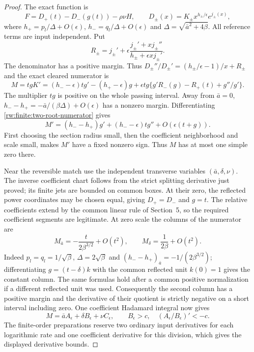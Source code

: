 \begin{proof}
The exact function is
\[
 F=D_+(t)-D_-(g(t))-\rho\nu H,\qquad
 D_\pm(x)=K_\pm x^{h_\pm/\epsilon}e^{j_\pm(x)},
\]
where $h_+=p_l/\Delta+O(\epsilon)$,
$h_-=q_l/\Delta+O(\epsilon)$ and $\Delta=\sqrt{\bar a^2+4\beta}$.
All reference terms are input independent. Put
\[
 R_\pm=j_\pm'+\epsilon
       \frac{j_\pm'+xj_\pm''}{h_\pm+\epsilon xj_\pm'}.
\]
The denominator has a positive margin. Thus
$D_\pm''/D_\pm'=(h_\pm/\epsilon-1)/x+R_\pm$
and the exact cleared numerator is
\begin{equation}\label{rw:finite:two-root-numerator}
 M=tgK'=(h_--\epsilon)tg'-(h_+-\epsilon)g
        +\epsilon tg\{g'R_-(g)-R_+(t)+g''/g'\}.
\end{equation}
The multiplier $tg$ is positive on the whole passing interval.
Away from $\bar a=0$,
$h_--h_+=-\bar a/(\beta\Delta)+O(\epsilon)$ has a nonzero
margin. Differentiating \eqref{rw:finite:two-root-numerator} gives
\[
 M'=(h_--h_+)g'+(h_--\epsilon)tg''+O(\epsilon(t+g)).
\]
First choosing the section radius small, then the coefficient
neighborhood and scale small, makes $M'$ have a fixed nonzero
sign. Thus $M$ has at most one simple zero there.

Near the reversible match use the independent transverse variables
$(\bar a,\delta,\nu)$. The inverse coefficient chart follows
from the strict splitting derivative just proved; its finite jets
are bounded on common boxes. At their zero, the reflected power
coordinates may be chosen equal, giving $D_+=D_-$ and $g=t$.
The relative coefficients extend by the common linear rule of
Section~5, so the required coefficient segments are legitimate.
At zero scale the columns of the numerator are
\[
 M_{\bar a}=-\frac{t}{2\beta^{3/2}}+O(t^2),\qquad
 M_\delta=\frac1{2\beta}+O(t^2).
\]
Indeed $p_l=q_l=1/\sqrt\beta$, $\Delta=2\sqrt\beta$ and
$(h_--h_+)_{\bar a}=-1/(2\beta^{3/2})$; differentiating
$g=(t-\delta)k$ with the common reflected unit $k(0)=1$
gives the constant column. The same formulas hold after a common
positive normalization if a different reflected unit was used.
Consequently the second column has a positive margin and the
derivative of their quotient is strictly negative on a short
interval including zero. One coefficient Hadamard integral now
gives
\[
 M=\bar a A_\epsilon+\delta B_\epsilon+\nu C_\epsilon,
 \qquad B_\epsilon>c,\quad (A_\epsilon/B_\epsilon)'<-c.
\]
The finite-order preparations reserve two ordinary input derivatives
for each logarithmic rate and one coefficient derivative for this
division, which gives the displayed derivative bounds.


\end{proof}

